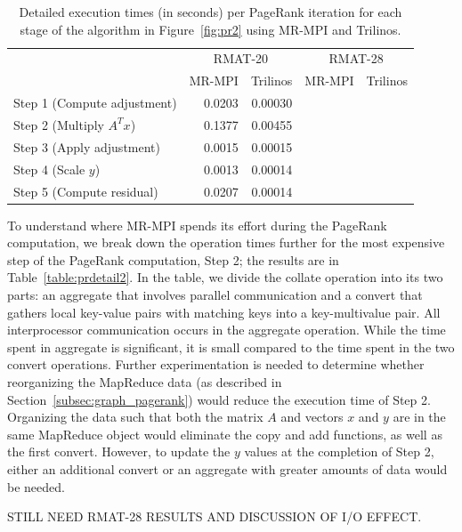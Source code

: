 \begin{table}[htb]
\begin{center}
\begin{tabular}{|l|r|r|r|r|}
\hline 
& \multicolumn{2}{|c|}{RMAT-20} & \multicolumn{2}{|c|}{RMAT-28} \\
& MR-MPI & Trilinos & MR-MPI & Trilinos  \\
\hline
Step 1 (Compute adjustment) & 0.0203 & 0.00030 &
&  \\
Step 2 (Multiply $A^T x$) & 0.1377 & 0.00455 &
&  \\
Step 3 (Apply adjustment) & 0.0015 & 0.00015 &
&  \\
Step 4 (Scale $y$)  & 0.0013 & 0.00014 &
& \\
Step 5 (Compute residual)  & 0.0207 & 0.00014 &
& \\
\hline
\end{tabular}
\caption{Detailed execution times (in seconds) per PageRank iteration
for each stage of the algorithm
in Figure~\ref{fig:pr2} using MR-MPI and Trilinos.}
\label{table:prdetail}
\end{center}
\end{table}


To understand where MR-MPI spends its effort during the PageRank computation,
we break down the operation times further for the most expensive 
step of the PageRank computation, Step 2; the results are in 
Table~\ref{table:prdetail2}.
In the table, we divide the collate operation into its
two parts:  an aggregate that involves parallel communication and a convert
that gathers local key-value pairs with matching keys into a key-multivalue
pair.  All interprocessor communication occurs in the aggregate operation.
While the time spent in aggregate is significant, it is small compared to
the time spent in the two convert operations.  Further experimentation
is needed to determine whether reorganizing the MapReduce data 
(as described in Section~\ref{subsec:graph_pagerank}) would reduce the
execution time of Step 2.  Organizing the data such that both the matrix
$A$ and vectors $x$ and $y$ are in the same MapReduce object would eliminate
the copy and add functions, as well as the first convert.  However, to update
the $y$ values at the completion of Step 2, either an additional convert
or an aggregate with greater amounts of data would be needed.

STILL NEED RMAT-28 RESULTS AND DISCUSSION OF I/O EFFECT.

